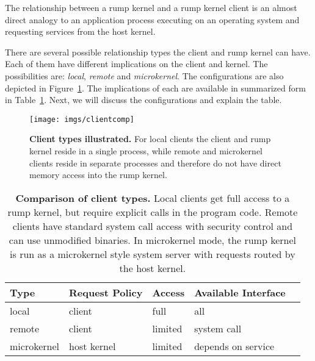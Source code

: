 The relationship between a rump kernel and a rump kernel client is
an almost direct analogy to an application process executing on an
operating system and requesting services from the host kernel.

There are several possible relationship
types the client and rump kernel can have.  Each of them have
different implications on the client and kernel.  The possibilities
are: \textit{local}, \textit{remote} and \textit{microkernel}.
The configurations are also depicted in Figure~\ref{fig:clidiag}.
The implications of each are available in summarized form in
Table~\ref{tab:clients}.  Next, we will discuss the configurations and
explain the table.

\begin{figure}[t]
\texttt{[image: imgs/clientcomp]}
\caption[Client types illustrated]{\textbf{Client types illustrated.}
For local clients the client and rump kernel reside in a single process,
while remote and microkernel clients reside in separate processes and
therefore do not have direct memory access into the rump kernel.
}
\label{fig:clidiag}
\end{figure}

\begin{table}[t]
\begin{tabular}{| l | l | l | l | l |}
\hline
Type & Request Policy & Access & Available Interface \\
\hline
\hline
local & client & full & all \\
\hline
remote & client & limited & system call \\
\hline
microkernel & host kernel & limited & depends on service \\
\hline
\end{tabular}
\caption[Comparison of client types]{\textbf{Comparison of client types.}
Local clients get full access to a rump kernel, but require explicit
calls in the program code.  Remote clients have standard system
call access with security control and can use unmodified binaries.
In microkernel mode, the rump kernel is run as a microkernel style system
server with requests routed by the host kernel.
}
\label{tab:clients}
\end{table}

